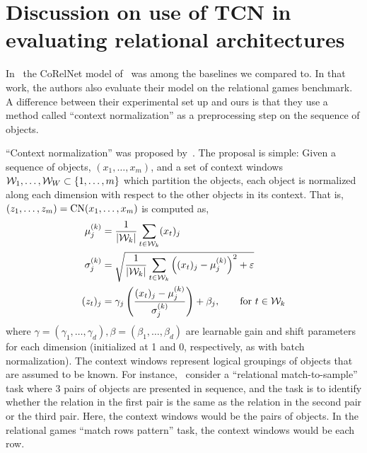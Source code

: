 \section{Discussion on use of TCN in evaluating relational architectures}\label{sec:appendix_tcn_discussion}

In~ the CoRelNet model of~\citet{kergNeuralArchitecture2022} was among the baselines we compared to. In that work, the authors also evaluate their model on the relational games benchmark. A difference between their experimental set up and ours is that they use a method called ``context normalization'' as a preprocessing step on the sequence of objects.

``Context normalization'' was proposed by~\citet{webbLearningRepresentationsThat2020}. The proposal is simple: Given a sequence of objects, $(x_1, \ldots, x_m)$, and a set of context windows ${\mathcal{W}}_1, \ldots, {\mathcal{W}}_W \subset \left\{1, \ldots, m\right\}$ which partition the objects, each object is normalized along each dimension with respect to the other objects in its context. That is, $\left(z_1, \ldots, z_m\right) = \mathrm{CN}(x_1, \ldots, x_m)$ is computed as,
\begin{eqnarray*}
    \begin{split}
        \mu_j^{(k)} &= \frac{1}{\left\lvert{\mathcal{W}}_k\right\rvert} \sum_{t \in {\mathcal{W}}_k} (x_t)_j\\
        \sigma_j^{(k)} &= \sqrt{ \frac{1}{\left\lvert{\mathcal{W}}_k\right\rvert} \sum_{t \in {\mathcal{W}}_k} \left((x_t)_j - \mu_j^{(k)}\right)^2 + \varepsilon}\\
        (z_t)_j &= \gamma_j \left(\frac{(x_t)_j - \mu_j^{(k)}}{\sigma_j^{(k)}}\right) + \beta_j, \qquad \text{for } t \in {\mathcal{W}}_k
    \end{split}
\end{eqnarray*}
where $\gamma = (\gamma_1, \ldots, \gamma_d), \beta = (\beta_1, \ldots, \beta_d)$ are learnable gain and shift parameters for each dimension (initialized at 1 and 0, respectively, as with batch normalization). The context windows represent logical groupings of objects that are assumed to be known. For instance,~\citep{webbEmergentSymbols2021,kergNeuralArchitecture2022} consider a ``relational match-to-sample'' task where 3 pairs of objects are presented in sequence, and the task is to identify whether the relation in the first pair is the same as the relation in the second pair or the third pair. Here, the context windows would be the pairs of objects. In the relational games ``match rows pattern'' task, the context windows would be each row.

